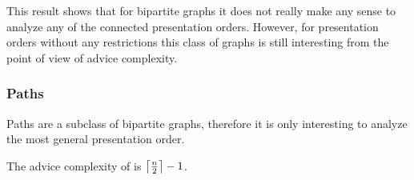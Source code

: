 This result shows that for bipartite graphs it does not really make any
sense to analyze any of the connected presentation orders. However, for
presentation orders without any restrictions this class of graphs is still
interesting from the point of view of advice complexity.

\subsubsection{Paths}

Paths are a subclass of bipartite graphs, therefore it is only interesting
to analyze the most general presentation order.

\begin{theorem}\label{theorem:paths-any}
    The advice complexity of  is
    $\ceil*{\frac{n}{2}} - 1$.
\end{theorem}

